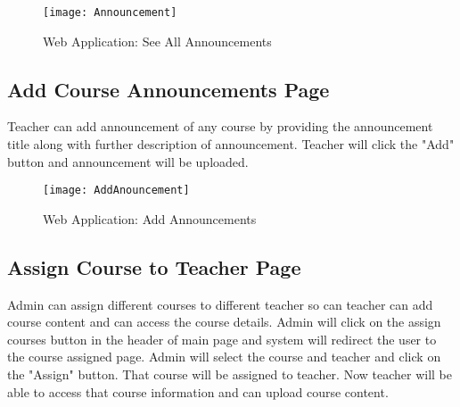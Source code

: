 \begin{figure}[h]
  \centering
  \texttt{[image: Announcement]}
  \caption{Web Application: See All Announcements}
\end{figure}

\subsection{Add Course Announcements Page}
Teacher can add announcement of any course by providing the announcement title along with further description of announcement. Teacher will click the "Add" button and announcement will be uploaded.

\begin{figure}[h]
  \centering
  \texttt{[image: AddAnouncement]}
  \caption{Web Application: Add Announcements}
\end{figure}


\subsection{Assign Course to Teacher Page}
Admin can assign different courses to different teacher so can teacher can add course content and can access the course details. Admin will click on the assign courses button in the header of main page and system will redirect the user to the course assigned page. Admin will select the course and teacher and click on the "Assign" button. That course will be assigned to teacher. Now teacher will be able to access that course information and can upload course content.


